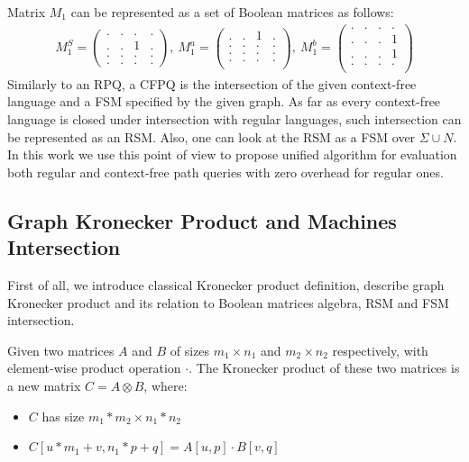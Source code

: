 Matrix $M_1$ can be represented as a set of Boolean matrices as follows:
{\small
\begin{align*}
M_1^S =
\begin{pmatrix}      
    . & . & . & .   \\
    . & . & 1 & .   \\
    . & . & . & .   \\
    . & . & . & .   
\end{pmatrix},~M_1^a =
\begin{pmatrix}       
   . & . & 1 & .   \\
   . & . & . & .   \\
   . & . & . & .   \\
   . & . & . & .   \\
\end{pmatrix},~M_1^b =
\begin{pmatrix}      
    . & . & . & .   \\
    . & . & . & 1   \\
    . & . & . & 1   \\
    . & . & . & .   \\
\end{pmatrix}
\end{align*}
}
Similarly to an RPQ, a CFPQ is the intersection of the given context-free language and a FSM specified by the given graph.
As far as every context-free language is closed under intersection with regular languages, such intersection can be represented as an RSM.
Also, one can look at the RSM as a FSM over $\Sigma \cup N$.
In this work we use this point of view to propose unified algorithm for evaluation both regular and context-free path queries with zero overhead for regular ones. 

\subsection{Graph Kronecker Product and Machines Intersection}

First of all, we introduce classical Kronecker product definition, 
describe graph Kronecker product and its relation to Boolean matrices algebra, 
RSM and FSM intersection.

\begin{definition}
Given two matrices $A$ and $B$ of sizes $m_1 \times n_1$ and $m_2 \times n_2$ 
respectively, with element-wise product operation $\cdot$.
The Kronecker product of these two matrices is a new matrix $C = A \otimes B$, where: 
 \begin{itemize}
     \item $C$ has size $m_1 * m_2 \times n_1 * n_2$
     \item $C[u * m_1 + v,n_1 * p + q] = A[u,p] \cdot B[v,q]$
 \end{itemize}
\end{definition}

